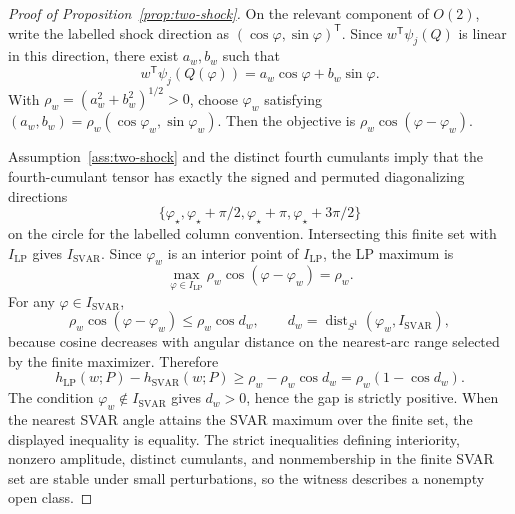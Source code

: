 \documentclass[11pt]{article}
\newcommand{\transpose}{\mathsf{T}}
\theoremstyle{definition}
\theoremstyle{plain}
\theoremstyle{remark}
\begin{document}
\begin{proof}[Proof of Proposition~\ref{prop:two-shock}]
On the relevant component of \(O(2)\), write the labelled shock direction as
\((\cos\varphi,\sin\varphi)^\transpose\).  Since \(w^\transpose\psi_j(Q)\) is
linear in this direction, there exist \(a_w,b_w\) such that
\[
w^\transpose\psi_j(Q(\varphi))=a_w\cos\varphi+b_w\sin\varphi.
\]
With \(\rho_w=(a_w^2+b_w^2)^{1/2}>0\), choose \(\varphi_w\) satisfying
\((a_w,b_w)=\rho_w(\cos\varphi_w,\sin\varphi_w)\).  Then the objective is
\(\rho_w\cos(\varphi-\varphi_w)\).

Assumption~\ref{ass:two-shock} and the distinct fourth cumulants imply that
the fourth-cumulant tensor has exactly the signed and permuted diagonalizing
directions
\[
\{\varphi_\star,\varphi_\star+\pi/2,\varphi_\star+\pi,
\varphi_\star+3\pi/2\}
\]
on the circle for the labelled column convention.  Intersecting this finite
set with \(I_{\mathrm{LP}}\) gives \(I_{\mathrm{SVAR}}\).  Since \(\varphi_w\)
is an interior point of \(I_{\mathrm{LP}}\), the LP maximum is
\[
\max_{\varphi\in I_{\mathrm{LP}}}\rho_w\cos(\varphi-\varphi_w)=\rho_w.
\]
For any \(\varphi\in I_{\mathrm{SVAR}}\),
\[
\rho_w\cos(\varphi-\varphi_w)\le
\rho_w\cos d_w,
\qquad d_w=\operatorname{dist}_{S^1}(\varphi_w,I_{\mathrm{SVAR}}),
\]
because cosine decreases with angular distance on the nearest-arc range
selected by the finite maximizer.  Therefore
\[
h_{\mathrm{LP}}(w;P)-h_{\mathrm{SVAR}}(w;P)
\ge \rho_w-\rho_w\cos d_w
=\rho_w(1-\cos d_w).
\]
The condition \(\varphi_w\notin I_{\mathrm{SVAR}}\) gives \(d_w>0\), hence the
gap is strictly positive.  When the nearest SVAR angle attains the SVAR maximum
over the finite set, the displayed inequality is equality.  The strict
inequalities defining interiority, nonzero amplitude, distinct cumulants, and
nonmembership in the finite SVAR set are stable under small perturbations, so
the witness describes a nonempty open class.
\end{proof}
\end{document}
